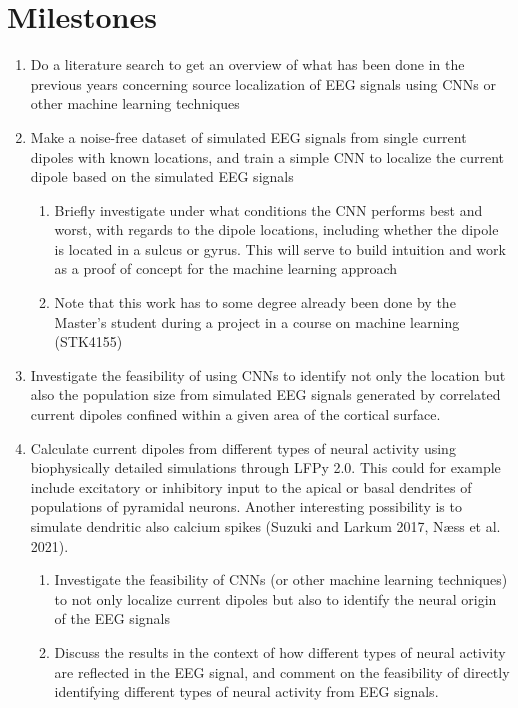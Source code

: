 \documentclass[a4paper,onecolumn,11pt]{revtex4-1}
\begin{document}
\section*{Milestones}
\begin{enumerate}
\item Do a literature search to get an overview of what has been done in the previous years concerning source localization of EEG signals using CNNs or other machine learning techniques
\item Make a noise-free dataset of simulated EEG signals from single current dipoles with known locations, and train a simple CNN to localize the current dipole based on the simulated EEG signals
\begin{enumerate}
\item Briefly investigate under what conditions the CNN performs best and worst, with regards to the dipole locations, including whether the dipole is located in a sulcus or gyrus. This will serve to build intuition and work as a proof of concept for the machine learning approach
\item Note that this work has to some degree already been done by the Master’s student during a project in a course on machine learning (STK4155)
\end{enumerate}
\item Investigate the feasibility of using CNNs to identify not only the location but also the population size from simulated EEG signals generated by correlated current dipoles confined within a given area of the cortical surface. 
\item Calculate current dipoles from different types of neural activity using biophysically detailed simulations through LFPy 2.0. This could for example include excitatory or inhibitory input to the apical or basal dendrites of populations of pyramidal neurons. Another interesting possibility is to simulate dendritic also calcium spikes (Suzuki and Larkum 2017, Næss et al. 2021).
\begin{enumerate}
\item Investigate the feasibility of CNNs (or other machine learning techniques) to not only localize current dipoles but also to identify the neural origin of the EEG signals
\item Discuss the results in the context of how different types of neural activity are reflected in the EEG signal, and comment on the feasibility of directly identifying different types of neural activity from EEG signals.
\end{enumerate}
\end{enumerate}
\end{document}
